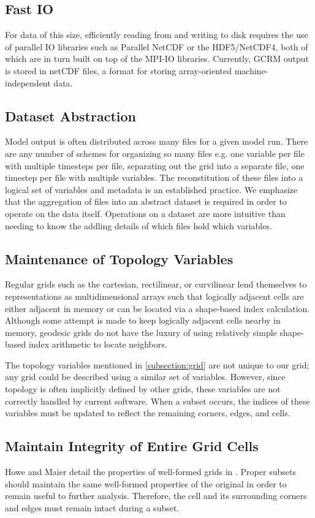 \subsection{Fast IO}

For data of this size, efficiently reading from and writing to disk requires
the use of parallel IO libraries such as Parallel NetCDF\cite{PNETCDF} or the
HDF5/NetCDF4\cite{HDF5}\cite{NETCDF}, both of which are in turn built on top
of the MPI-IO libraries\cite{MPIIO}.  Currently, GCRM output is stored in
netCDF\cite{NETCDF} files, a format for storing array-oriented
machine-independent data.

\subsection{Dataset Abstraction}

Model output is often distributed across many files for a given model run.
There are any number of schemes for organizing so many files e.g. one variable
per file with multiple timesteps per file, separating out the grid into a
separate file, one timestep per file with multiple variables.  The
reconstitution of these files into a logical set of variables and metadata is
an established practice\cite{NcML,THREDDS}.  We emphasize that the aggregation
of files into an abstract dataset is required in order to operate on the data
itself.  Operations on a dataset are more intuitive than needing to know the
addling details of which files hold which variables.

\subsection{Maintenance of Topology Variables}

Regular grids such as the cartesian, rectilinear, or curvilinear lend
themselves to representations as multidimensional arrays such that logically
adjacent cells are either adjacent in memory or can be located via a
shape-based index calculation.  Although some attempt is made to keep
logically adjacent cells nearby in memory, geodesic grids do not have the
luxury of using relatively simple shape-based index arithmetic to locate
neighbors.

The topology variables mentioned in \ref{subsection:grid} are not unique to
our grid; any grid could be described using a similar set of variables.
However, since topology is often implicitly defined by other grids, these
variables are not correctly handled by current software.  When a subset
occurs, the indices of these variables must be updated to reflect the
remaining corners, edges, and cells.

\subsection{Maintain Integrity of Entire Grid Cells}

Howe and Maier detail the properties of well-formed grids in \cite{UGRID}.
Proper subsets should maintain the same well-formed properties of the original
in order to remain useful to further analysis.  Therefore, the cell and its
surrounding corners and edges must remain intact during a subset.
